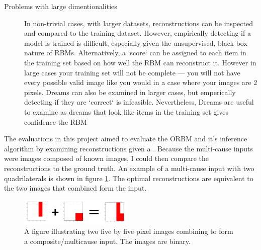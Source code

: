 \begin{description}
  \item[Problems  with large dimentionalities] In non-trivial cases, with larger datasets, reconstructions can be inspected and compared to the training dataset. However, empirically detecting if a model is trained is difficult, especially given the unsupervised, black box nature of RBMs.
  Alternatively, a `score` can be assigned to each item in the training set based on how well the RBM can reconstruct it. However in large cases your training set will not be complete --- you will not have every possible valid image like you would in a case where your images are 2 pixels.
  Dreams can also be examined in larger cases, but emperically detecting if they are `correct` is infeasible. Nevertheless, Dreams are useful to examine as dreams that look like items in the training set gives confidence the RBM 

\end{description}



The evaluations in this project aimed to evaluate the ORBM and it's inference algorithm by examining reconstructions given a . Because the multi-cause inputs were images composed of known images, I could then compare the reconstructions to the ground truth. An example of a multi-cause input with two quadrilaterals is shown in figure \ref{F:Composite-Example}. The optimal reconstructions are equivalent to the two images that combined form the input.

\begin{figure}
  \begin{center}
    \includegraphics[width=0.48\textwidth]{Assets/Composite-Example.png}
  \end{center}
  \caption{A figure illustrating two five by five pixel images combining to form a composite/multicause input. The images are binary.}
  \label{F:Composite-Example}
\end{figure}

